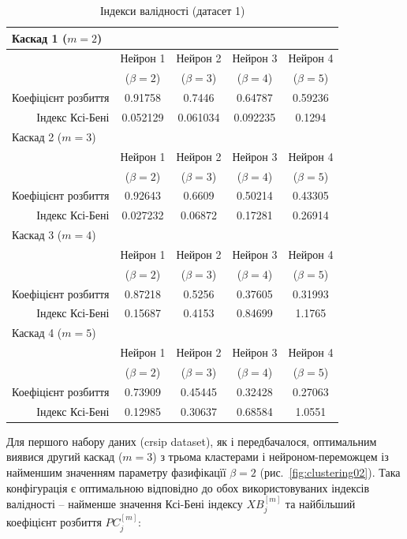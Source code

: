 \documentclass{vakthesis}
\begin{document}
\begin{table}[ht]
\centering \small \begin{tabular}{rcccc}
\hline \multicolumn{4}{l}{Каскад 1 ($m=2$)}\\ \hline & Нейрон 1  & Нейрон 2 & Нейрон 3  & Нейрон 4 \\ &($\beta=2$) & ($\beta=3$) & ($\beta=4$) & ($\beta=5$) \\Коефіцієнт розбиття &
0.91758 & 0.7446 & 0.64787 & 0.59236 \\
Індекс Ксі-Бені &
0.052129 & 0.061034 & 0.092235 & 0.1294 \\
\hline \multicolumn{4}{l}{Каскад 2 ($m=3$)}\\ \hline & Нейрон 1  & Нейрон 2 & Нейрон 3  & Нейрон 4 \\ &($\beta=2$) & ($\beta=3$) & ($\beta=4$) & ($\beta=5$) \\
Коефіцієнт розбиття &
0.92643 & 0.6609 & 0.50214 & 0.43305 \\
Індекс Ксі-Бені &
0.027232 & 0.06872 & 0.17281 & 0.26914 \\
\hline \multicolumn{4}{l}{Каскад 3 ($m=4$)}\\ \hline & Нейрон 1  & Нейрон 2 & Нейрон 3  & Нейрон 4 \\ &($\beta=2$) & ($\beta=3$) & ($\beta=4$) & ($\beta=5$) \\
Коефіцієнт розбиття &
0.87218 & 0.5256 & 0.37605 & 0.31993 \\
Індекс Ксі-Бені &
0.15687 & 0.4153 & 0.84699 & 1.1765 \\
\hline \multicolumn{4}{l}{Каскад 4 ($m=5$)}\\ \hline & Нейрон 1  & Нейрон 2 & Нейрон 3  & Нейрон 4 \\ &($\beta=2$) & ($\beta=3$) & ($\beta=4$) & ($\beta=5$) \\
Коефіцієнт розбиття &
0.73909 & 0.45445 & 0.32428 & 0.27063 \\
Індекс Ксі-Бені &
0.12985 & 0.30637 & 0.68584 & 1.0551 \\
\hline
\end{tabular}
\caption{Індекси валідності (датасет 1)}
\label{tabel:kysymys}
\end{table}

Для першого набору даних (crsip dataset), як і передбачалося, оптимальним виявися другий каскад ($m=3$) з трьома кластерами і нейроном-переможцем із найменшим значенням параметру фазифікацїї $\beta = 2$ (рис.~\ref{fig:clustering02}). Така конфігурація є оптимальною відповідно до обох використовуваних індексів валідності -- найменше значення Ксі-Бені індексу $XB_j^{[m]}$ та найбільший коефіцієнт розбиття $PC_j^{[m]}$: 
\end{document}
